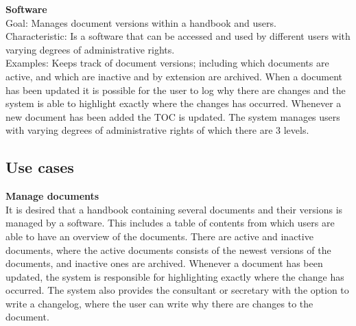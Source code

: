 \textbf{Software}
\\%
Goal: Manages document versions within a handbook and users.
\\
Characteristic: 
Is a software that can be accessed and used by different users with varying degrees of administrative rights.
\\
Examples: Keeps track of document versions; including which documents are active, and which are inactive and by extension are archived. 
When a document has been updated it is possible for the user to log why there are changes and the system is able to highlight exactly where the changes has occurred.
Whenever a new document has been added the TOC is updated.
The system manages users with varying degrees of administrative rights of which there are 3 levels.


\subsection{Use cases} \label{sec:usecases}
\textbf{Manage documents}
\\
It is desired that a handbook containing several documents and their versions is managed by a software. 
This includes a table of contents from which users are able to have an overview of the documents. 
There are active and inactive documents, where the active documents consists of the newest versions of the documents, and inactive ones are archived. 
Whenever a document has been updated, the system is responsible for highlighting exactly where the change has occurred. 
The system also provides the consultant or secretary with the option to write a changelog, where the user can write why there are changes to the document.

